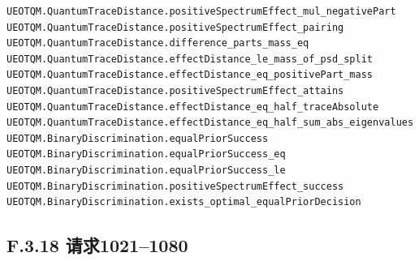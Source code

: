 \documentclass[
  11pt,
  oneside]{book}
\begin{document}
\begin{Verbatim}[breaklines,breakanywhere,fontsize=\scriptsize]
UEOTQM.QuantumTraceDistance.positiveSpectrumEffect_mul_negativePart
UEOTQM.QuantumTraceDistance.positiveSpectrumEffect_pairing
UEOTQM.QuantumTraceDistance.difference_parts_mass_eq
UEOTQM.QuantumTraceDistance.effectDistance_le_mass_of_psd_split
UEOTQM.QuantumTraceDistance.effectDistance_eq_positivePart_mass
UEOTQM.QuantumTraceDistance.positiveSpectrumEffect_attains
UEOTQM.QuantumTraceDistance.effectDistance_eq_half_traceAbsolute
UEOTQM.QuantumTraceDistance.effectDistance_eq_half_sum_abs_eigenvalues
UEOTQM.BinaryDiscrimination.equalPriorSuccess
UEOTQM.BinaryDiscrimination.equalPriorSuccess_eq
UEOTQM.BinaryDiscrimination.equalPriorSuccess_le
UEOTQM.BinaryDiscrimination.positiveSpectrumEffect_success
UEOTQM.BinaryDiscrimination.exists_optimal_equalPriorDecision
\end{Verbatim}

\subsection{F.3.18 请求1021--1080}
\end{document}
